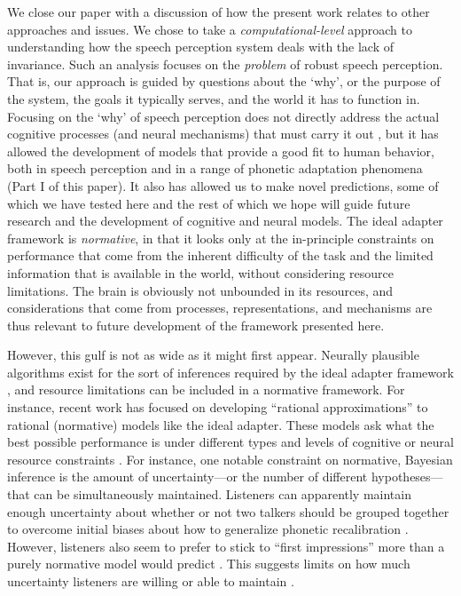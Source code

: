 We close our paper with a discussion of how the present work relates to other approaches and issues.  We chose to take a \emph{computational-level} approach to understanding how the speech perception system deals with the lack of invariance. Such an analysis focuses on the \emph{problem} of robust speech perception. That is, our approach is guided by questions about the `why', or the purpose of the system, the goals it typically serves, and the world it has to function in.  Focusing on the `why' of speech perception does not  directly address the actual cognitive processes (and neural mechanisms) that must carry it out \autocite{Marr1982}, but it has allowed the development of models that provide a good fit to human behavior, both in speech perception \autocite{Clayards2008,Feldman2009a,Norris2008,Sonderegger2010} and in a range of phonetic adaptation phenomena (Part I of this paper).  It also has allowed us to make novel predictions, some of which we have tested here and the rest of which we hope will guide future research and the development of cognitive and neural models.  The ideal adapter framework is \emph{normative}, in that it looks only at the in-principle constraints on performance that come from the inherent difficulty of the task and the limited information that is available in the world, without considering resource limitations.  The brain is obviously not unbounded in its resources, and considerations that come from processes, representations, and mechanisms are thus relevant to future development of the framework presented here. 

However, this gulf is not as wide as it might first appear.  Neurally plausible algorithms exist for the sort of inferences required by the ideal adapter framework \autocite{Beck2012a,Friston2005,Rao1999}, and resource limitations can be included in a normative framework. For instance, recent work has focused on developing ``rational approximations'' to rational (normative) models like the ideal adapter.  These models ask what the best possible performance is under different types and levels of cognitive or neural resource constraints \autocite{Griffiths2012,Sanborn2010,Shi2010}.  For instance, one notable constraint on normative, Bayesian inference is the amount of uncertainty---or the number of different hypotheses---that can be simultaneously maintained.  Listeners can apparently maintain enough uncertainty about whether or not two talkers should be grouped together to overcome initial biases about how to generalize phonetic recalibration \autocite{Kraljic2005,Kraljic2006,Munson2011}.  However, listeners also seem to prefer to stick to ``first impressions'' more than a purely normative model would predict \autocite{Kraljic2008a}.  This suggests limits on how much uncertainty listeners are willing or able to maintain \autocite[see also][for related effects of presentation order when generalizing across talkers]{Tzeng2014}.
\label{r1-kraljic08-discuss}


